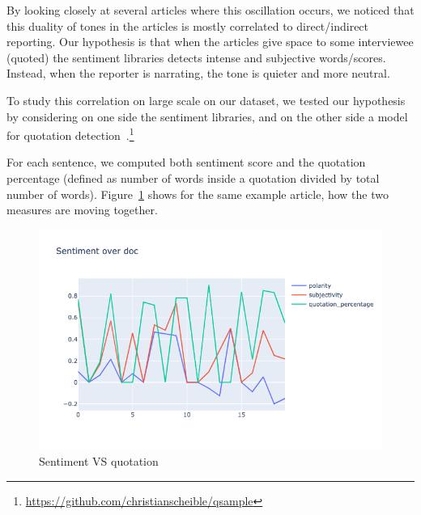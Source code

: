 By looking closely at several articles where this oscillation occurs, we noticed that this duality of tones in the articles is mostly correlated to direct/indirect reporting. 
Our hypothesis is that when the articles give space to some interviewee (quoted) the sentiment libraries detects intense and subjective words/scores. Instead, when the reporter is narrating, the tone is quieter and more neutral.

To study this correlation on large scale on our dataset, we tested our hypothesis by considering on one side the sentiment libraries, and on the other side a model for quotation detection~\citep{scheible2016model}.\footnote{\url{https://github.com/christianscheible/qsample}}

For each sentence, we computed both sentiment score and the quotation percentage (defined as number of words inside a quotation divided by total number of words).
Figure~\ref{fig:sentiment_vs_quotation} shows for the same example article, how the two measures are moving together.

\begin{figure}[!htbp]
    \centering
    \includegraphics[width=\linewidth]{figures/sentiment_vs_quotation.png}
    \caption{Sentiment VS quotation}
    \label{fig:sentiment_vs_quotation}
\end{figure}

